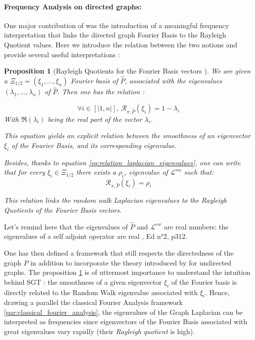 \documentclass[sn-mathphys]{sn-jnl}%
\theoremstyle{thmstyleone}%
\newtheorem{prop}[theo]{Proposition}
\theoremstyle{thmstyletwo}%
\theoremstyle{thmstylethree}%
\begin{document}
\paragraph{Frequency Analysis on directed graphs:}
One major contribution of \cite{sevi2019} was the introduction of a
meaningful frequency interpretation that links the directed graph
Fourier Basis to the Rayleigh Quotient values. Here we introduce the
relation between the two notions and provide several useful
interpretations :

\begin{prop}[Rayleigh Quotients for the Fourier Basis vectors \cite{sevi2019}]\label{prop:frequencies_rayleigh}
  We are given a $\Xi_{1/2} = (\xi_1, \hdots, \xi_n)$ Fourier basis of
  $\hat{P}$, associated with the eigenvalues
  $(\lambda_1, \hdots, \lambda_n)$ of $\hat{P}$. Then one has the
  relation :

\begin{equation}
    \forall i \in [|1, n|], \ \mathcal{R}_{\pi, \hat{P}}(\xi_i) = 1 - \lambda_i
\end{equation}
With $\Re(\lambda_i)$ being the real part of the vector $\lambda_i$.

This equation yields an explicit relation between the smoothness of an
eigenvector $\xi_i$ of the Fourier Basis, and its corresponding
eigenvalue.

Besides, thanks to equation \ref{eq:relation_laplacian_eigenvalues},
one can write that for every $\xi_i \in \Xi_{1/2}$ there exists a
$\rho_i$, eigenvalue of $\mathcal{L}^{rw}$ such that:
\begin{equation}
    \mathcal{R}_{\pi, \hat{P}}(\xi_i) = \rho_i
\end{equation}

This relation links the random walk Laplacian eigenvalues to the
Rayleigh Quotients of the Fourier Basis vectors.

\end{prop}

Let's remind here that the eigenvalues of $\hat{P}$ and
$\mathcal{L}^{rw}$ are real numbers: the eigenvalues of a self adjoint
operator are real \cite{hoffman_kunze_1962}, Ed n°2, p312.

One has then defined a framework that still respects the directedness
of the graph $P$ in addition to incorporate the theory introduced by
\cite{shuman_narang_frossard_ortega_vandergheynst_2013,
  ricaud_borgnat_tremblay_goncalves_vandergheynst_2019} for undirected
graphs. The proposition \ref{prop:frequencies_rayleigh} is of
uttermost importance to understand the intuition behind SGT : the
smoothness of a given eigenvector $\xi_i$ of the Fourier basis is
directly related to the Random Walk eigenvalue associated with
$\xi_i$. Hence, drawing a parallel the classical Fourier Analysis
framework \ref{par:classical_fourier_analysis}, the eigenvalues of the
Graph Laplacian can be interpreted as frequencies since eigenvectors
of the Fourier Basis associated with great eigenvalues vary rapidly
(their \textit{Rayleigh quotient} is high).
\end{document}
